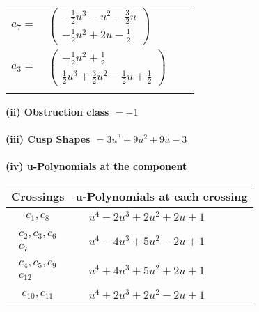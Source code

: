 \documentclass[1p]{elsarticle_modified}
\theoremstyle{definition}
\begin{document}
\begin{tabular}{m{7pt} m{180pt} m{7pt} m{180pt} }
\flushright $a_{7}=$&$\begin{pmatrix}-\frac{1}{2} u^3- u^2-\frac{3}{2} u\\-\frac{1}{2} u^2+2 u-\frac{1}{2}\end{pmatrix}$ \\
\flushright $a_{3}=$&$\begin{pmatrix}-\frac{1}{2} u^2+\frac{1}{2}\\\frac{1}{2} u^3+\frac{3}{2} u^2-\frac{1}{2} u+\frac{1}{2}\end{pmatrix}$\\&\end{tabular}
\flushleft \textbf{(ii) Obstruction class $= -1$}\\~\\
\flushleft \textbf{(iii) Cusp Shapes $= 3 u^3+9 u^2+9 u-3$}\\~\\
\newpage\renewcommand{\arraystretch}{1}
\flushleft \textbf{(iv) u-Polynomials at the component}\newline \\
\begin{tabular}{m{50pt}|m{274pt}}
Crossings & \hspace{64pt}u-Polynomials at each crossing \\
\hline $$\begin{aligned}c_{1},c_{8}\end{aligned}$$&$\begin{aligned}
&u^4-2 u^3+2 u^2+2 u+1
\end{aligned}$\\
\hline $$\begin{aligned}c_{2},c_{3},c_{6}\\c_{7}\end{aligned}$$&$\begin{aligned}
&u^4-4 u^3+5 u^2-2 u+1
\end{aligned}$\\
\hline $$\begin{aligned}c_{4},c_{5},c_{9}\\c_{12}\end{aligned}$$&$\begin{aligned}
&u^4+4 u^3+5 u^2+2 u+1
\end{aligned}$\\
\hline $$\begin{aligned}c_{10},c_{11}\end{aligned}$$&$\begin{aligned}
&u^4+2 u^3+2 u^2-2 u+1
\end{aligned}$\\
\hline
\end{tabular}\\~\\
\end{document}
